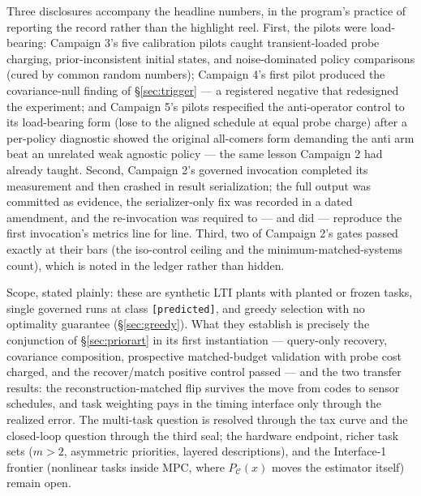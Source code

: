 \documentclass[letterpaper,onecolumn]{IEEEtran}
\theoremstyle{definition}
\theoremstyle{remark}
\newcommand{\PC}{P_{\mathcal{C}}}
\begin{document}
Three disclosures accompany the headline numbers, in the program's practice
of reporting the record rather than the highlight reel. First, the pilots
were load-bearing: Campaign 3's five calibration pilots caught
transient-loaded probe charging, prior-inconsistent initial states, and
noise-dominated policy comparisons (cured by common random numbers);
Campaign 4's first pilot produced the covariance-null finding of
\S\ref{sec:trigger} --- a registered negative that redesigned the
experiment; and Campaign 5's pilots respecified the anti-operator control
to its load-bearing form (lose to the aligned schedule at equal probe
charge) after a per-policy diagnostic showed the original all-comers form
demanding the anti arm beat an unrelated weak agnostic policy --- the same
lesson Campaign 2 had already taught. Second, Campaign 2's governed
invocation completed its
measurement and then crashed in result serialization; the full output was
committed as evidence, the serializer-only fix was recorded in a dated
amendment, and the re-invocation was required to --- and did --- reproduce
the first invocation's metrics line for line. Third, two of Campaign 2's
gates passed exactly at their bars (the iso-control ceiling and the
minimum-matched-systems count), which is noted in the ledger rather than
hidden.

Scope, stated plainly: these are synthetic LTI plants with planted or frozen
tasks, single governed runs at class \texttt{[predicted]}, and greedy
selection with no optimality guarantee (\S\ref{sec:greedy}). What they
establish is precisely the conjunction of \S\ref{sec:priorart} in its first
instantiation --- query-only recovery, covariance composition, prospective
matched-budget validation with probe cost charged, and the recover/match
positive control passed --- and the two transfer results: the
reconstruction-matched flip survives the move from codes to sensor
schedules, and task weighting pays in the timing interface only through
the realized error. The multi-task question is resolved through the tax
curve and the closed-loop question through the third seal; the hardware
endpoint, richer task sets ($m>2$, asymmetric priorities, layered
descriptions), and the Interface-1 frontier (nonlinear tasks inside
MPC, where $\PC(x)$ moves the estimator itself) remain open.
\end{document}
